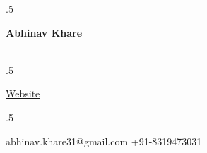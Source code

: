 \documentclass[margin, 7pt]{res} %
\begin{document}

\moveleft.5\hoffset\centerline{\huge\bf Abhinav Khare}\\%

 
\moveleft.5\hoffset\centerline{ \href{https://github.com/CosmicCoder96}{\faGithub} \hspace{0.1cm}\textbullet \hspace{0.1cm}\href{https://abhinavkhare.me}{Website}\hspace{0.1cm}\textbullet \hspace{0.1cm}\href{https://www.linkedin.com/in/abhinav-khare-a4444213a/}{\faLinkedin}}
\moveleft.5\hoffset\centerline{ abhinav.khare31@gmail.com\hspace{0.1cm} \textbullet \hspace{0.1cm}+91-8319473031}
\end{document}
